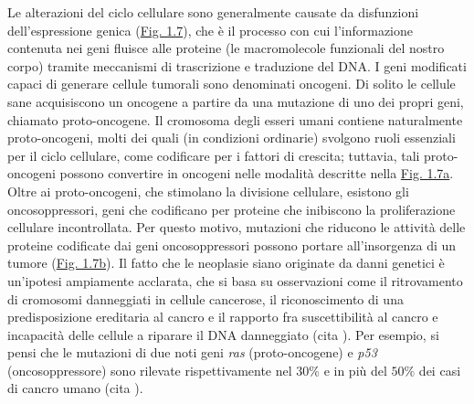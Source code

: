 \documentclass[12pt,a4paper,twoside]{report}
\begin{document}
	Le alterazioni del ciclo cellulare sono generalmente causate da disfunzioni dell'espressione genica (\hyperref[fig:mutazioni_genetiche]{Fig. 1.7}), che è il processo con cui l'informazione contenuta nei geni fluisce alle proteine (le macromolecole funzionali del nostro corpo) tramite meccanismi di trascrizione e traduzione del DNA. I geni modificati capaci di generare cellule tumorali sono denominati oncogeni. Di solito le cellule sane acquisiscono un oncogene a partire da una mutazione di uno dei propri geni, chiamato proto-oncogene. Il cromosoma degli esseri umani contiene naturalmente proto-oncogeni, molti dei quali (in condizioni ordinarie) svolgono ruoli essenziali per il ciclo cellulare, come codificare per i fattori di crescita; tuttavia, tali proto-oncogeni possono convertire in oncogeni nelle modalità descritte nella \hyperref[fig:oncogene]{Fig. 1.7a}. Oltre ai proto-oncogeni, che stimolano la divisione cellulare, esistono gli oncosoppressori, geni che codificano per proteine che inibiscono la proliferazione cellulare incontrollata. Per questo motivo, mutazioni che riducono le attività delle proteine codificate dai geni oncosoppressori possono portare all'insorgenza di un tumore (\hyperref[fig:oncosoppressore]{Fig. 1.7b}). Il fatto che le neoplasie siano originate da danni genetici è un'ipotesi ampiamente acclarata, che si basa su osservazioni come il ritrovamento di cromosomi danneggiati in cellule cancerose, il riconoscimento di una predisposizione ereditaria al cancro e il rapporto fra suscettibilità al cancro e incapacità delle cellule a riparare il DNA danneggiato (cita
	). Per esempio, si pensi che le mutazioni di due noti geni \textit{ras} (proto-oncogene) e \textit{p53} (oncosoppressore) sono rilevate rispettivamente nel $30\%$ e in più del $50\%$ dei casi di cancro umano (cita
	).
\end{document}
